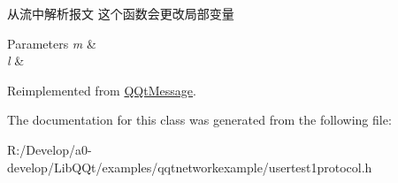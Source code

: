 从流中解析报文 这个函数会更改局部变量 


\begin{DoxyParams}{Parameters}
{\em m} & \\
\hline
{\em l} & \\
\hline
\end{DoxyParams}


Reimplemented from \mbox{\hyperlink{class_q_qt_message_a0bc25669bdd61490b1d8df6d77565f31}{Q\+Qt\+Message}}.



The documentation for this class was generated from the following file\+:\begin{DoxyCompactItemize}
\item 
R\+:/\+Develop/a0-\/develop/\+Lib\+Q\+Qt/examples/qqtnetworkexample/usertest1protocol.\+h\end{DoxyCompactItemize}
